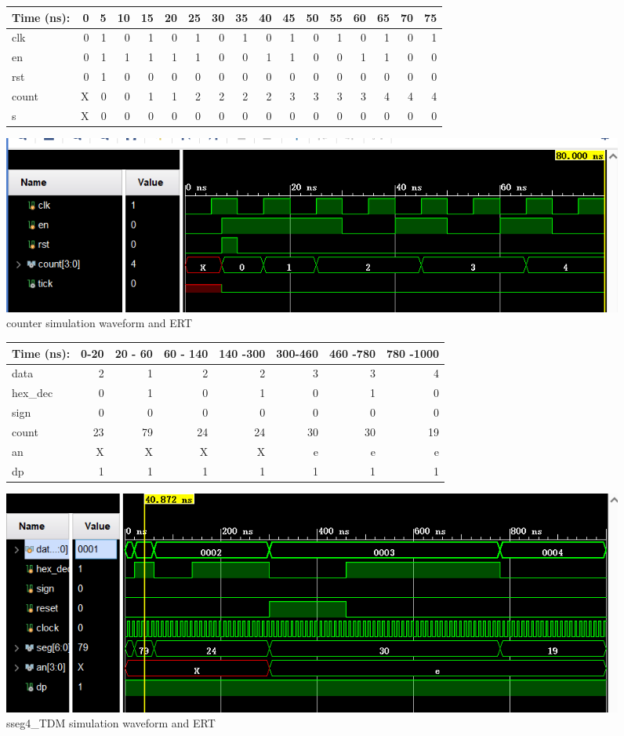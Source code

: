 \documentclass[11pt]{article}
\begin{document}
\begin{figure}[ht]\centering
	\begin{tabular}{l|rrrrrrrrrrrrrrrr}
		Time (ns): & 0 &5& 10 &15& 20&25 & 30&35&40&45&50&55&60&65&70&75 \\
		\midrule
		clk & 0 & 1 & 0 & 1 &0 &1 & 0& 1& 0 &1 & 0 & 1& 0 & 1& 0 & 1\\
		en & 0 & 1 & 1 & 1  & 1& 1 & 0 & 0 & 1 & 1 &0 & 0& 1 & 1 & 0 & 0\\
		rst & 0& 1& 0 & 0 & 0 & 0 &0 & 0 & 0 & 0 & 0 & 0 & 0 & 0 & 0 & 0\\
		\midrule
		count & X & 0 & 0 & 1 & 1 & 2 & 2 & 2 & 2 & 3 & 3 & 3 & 3 & 4 & 4 & 4\\
		s & X & 0 & 0 & 0 & 0 & 0 & 0 & 0 & 0 & 0 & 0 & 0 & 0 & 0 & 0 &0 \\
		\bottomrule
	\end{tabular}\medskip
	
	\includegraphics{countertest}
	\caption{counter simulation waveform and ERT}
	\label{fig:counter wave and ERT}
\end{figure}

\begin{figure}[ht]\centering
	\begin{tabular}{l|rrrrrrr}
		Time (ns): & 0-20 &20 - 60& 60 - 140 & 140 -300& 300-460 & 460 -780 & 780 -1000\\
		\midrule
		data & 2 & 1 & 2 & 2 & 3 &3& 4\\
		hex\_dec & 0 & 1 & 0 & 1  & 0 & 1 & 0 \\
		sign & 0& 0& 0 & 0 & 0 & 0 & 0\\
		\midrule
		count & 23 & 79 & 24&24 & 30 & 30 & 19 \\
		an & X & X & X & X & e & e & e \\
		dp & 1 & 1 & 1 & 1 & 1 & 1 & 1\\
		\bottomrule
	\end{tabular}\medskip
	
	\includegraphics{ssegtest}
	\caption{sseg4\_TDM simulation waveform and ERT}
	\label{fig:sseg4_TDM wave and ERT}
\end{figure}
\end{document}
